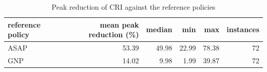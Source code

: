 \begin{table}[htbp]
\centering
\small
\caption{Peak reduction of CRI against the reference policies}
\label{tab:E9_managerial_reduction}
\begin{tabular}{lrrrrr}
\toprule
reference policy & mean peak reduction (\%) & median & min & max & instances \\
\midrule
ASAP & 53.39 & 49.98 & 22.99 & 78.38 & 72 \\
GNP & 14.02 & 9.98 & 1.99 & 39.87 & 72 \\
\bottomrule
\end{tabular}
\end{table}
